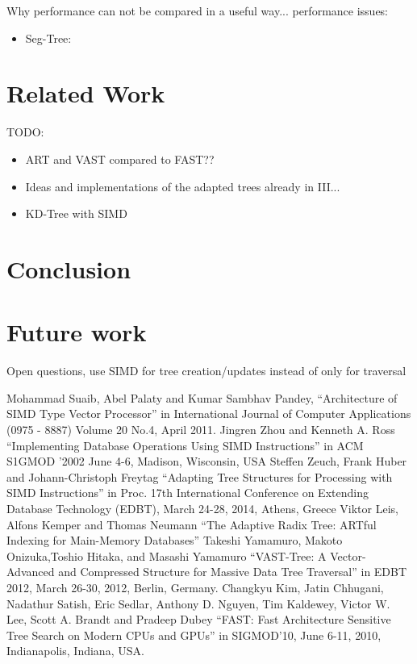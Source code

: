 \documentclass[conference]{IEEEtran}
\begin{document}
Why performance can not be compared in a useful way...
performance issues:
\begin{itemize}
	\item Seg-Tree: 
\end{itemize}
\section{Related Work}
TODO:
\begin{itemize}
	\item ART and VAST compared to FAST??
	\item Ideas and implementations of the adapted trees already in III...
	\item KD-Tree with SIMD
\end{itemize}

\section{Conclusion}

\section{Future work}
Open questions, use SIMD for tree creation/updates instead of only for traversal
\begin{thebibliography}{00}
Mohammad Suaib, Abel Palaty and Kumar Sambhav Pandey, ``Architecture of SIMD Type Vector Processor'' in International Journal of Computer Applications (0975 - 8887) Volume 20 No.4, April 2011.
 Jingren Zhou and Kenneth A. Ross  ``Implementing Database Operations Using SIMD Instructions'' in ACM S1GMOD '2002 June 4-6, Madison, Wisconsin, USA
 Steffen Zeuch, Frank Huber and Johann-Christoph Freytag  ``Adapting Tree Structures for Processing with SIMD Instructions'' in Proc. 17th International Conference on Extending Database Technology (EDBT), March 24-28, 2014, Athens, Greece
 Viktor Leis, Alfons Kemper and Thomas Neumann ``The Adaptive Radix Tree: ARTful Indexing for Main-Memory Databases''
 Takeshi Yamamuro, Makoto Onizuka,Toshio Hitaka, and Masashi Yamamuro ``VAST-Tree: A Vector-Advanced and Compressed Structure for Massive Data Tree Traversal'' in EDBT 2012, March 26-30, 2012, Berlin, Germany.
 Changkyu Kim, Jatin Chhugani, Nadathur Satish, Eric Sedlar, Anthony D. Nguyen,
Tim Kaldewey, Victor W. Lee, Scott A. Brandt and Pradeep Dubey ``FAST: Fast Architecture Sensitive Tree Search
on Modern CPUs and GPUs'' in SIGMOD’10, June 6-11, 2010, Indianapolis, Indiana, USA.
\end{thebibliography}
\end{document}
